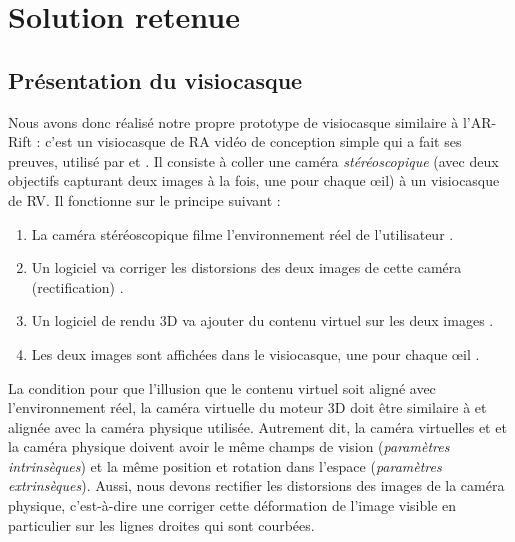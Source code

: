 \section{Solution retenue}
\subsection{Présentation du visiocasque}
\label{subsec:prototype}
Nous avons donc réalisé notre propre prototype de visiocasque  similaire à l'AR-Rift \citep{Steptoe2013} : c'est un visiocasque de RA vidéo de conception simple qui a fait ses preuves, utilisé par \cite{Steptoe2014} et \cite{Piumsomboon2014}. Il consiste à coller une caméra \emph{stéréoscopique} (avec deux objectifs capturant deux images à la fois, une pour chaque \oe il) à un visiocasque de RV. Il fonctionne sur le principe suivant :
\begin{enumerate}
  \item La caméra stéréoscopique filme l'environnement réel de l'utilisateur .
  \item Un logiciel va corriger les distorsions des deux images de cette caméra (rectification) .
  \item Un logiciel de rendu 3D va ajouter du contenu virtuel sur les deux images .
  \item Les deux images sont affichées dans le visiocasque, une pour chaque \oe il .
\end{enumerate}


La condition pour que l'illusion que le contenu virtuel soit aligné avec l'environnement réel, la caméra virtuelle du moteur 3D doit être similaire à et alignée avec la caméra physique utilisée. Autrement dit, la caméra virtuelles et et la caméra physique doivent avoir le même champs de vision (\emph{paramètres intrinsèques}) et la même position et rotation dans l'espace (\emph{paramètres extrinsèques}). Aussi, nous devons rectifier les distorsions des images de la caméra physique, c'est-à-dire une corriger cette déformation de l'image visible en particulier sur les lignes droites qui sont courbées.

